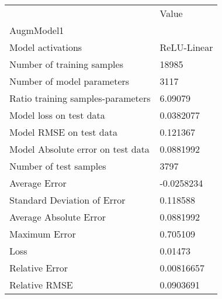 \begin{tabular}{ll}
\toprule
{} &        Value \\
AugmModel1                        &              \\
\midrule
Model activations                 &  ReLU-Linear \\
Number of training samples        &        18985 \\
Number of model parameters        &         3117 \\
Ratio training samples-parameters &      6.09079 \\
Model loss on test data           &    0.0382077 \\
Model RMSE on test data           &     0.121367 \\
Model Absolute error on test data &    0.0881992 \\
Number of test samples            &         3797 \\
Average Error                     &   -0.0258234 \\
Standard Deviation of Error       &     0.118588 \\
Average Absolute Error            &    0.0881992 \\
Maximum Error                     &     0.705109 \\
Loss                              &      0.01473 \\
Relative Error                    &   0.00816657 \\
Relative RMSE                     &    0.0903691 \\
\bottomrule
\end{tabular}
